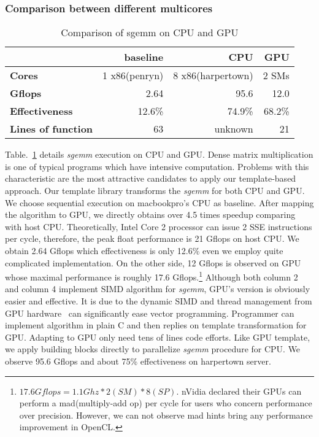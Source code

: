 \subsubsection{Comparison between different multicores}
\begin{table}[hbt]
\caption{Comparison of sgemm on CPU and GPU}\label{tbl:sgemm}
\begin{tabular}{|l|r|r|r|}
\hline
& baseline& CPU & GPU\\
\hline
\textbf{Cores} &1 x86(penryn)& 8 x86(harpertown)& 2 SMs\\
\hline
\textbf{Gflops}& 2.64 &95.6&  12.0\\
\hline
\textbf{Effectiveness}&12.6\%& 74.9\%&68.2\%\\
\hline
\textbf{Lines of function}&63&unknown&21\\
\hline
\end{tabular}
\end{table}

Table.~\ref{tbl:sgemm} details \textit{sgemm} execution on CPU and GPU. Dense matrix
multiplication is one of  typical programs which have
intensive computation. Problems with this characteristic are the most
attractive candidates to apply our template-based approach.
Our template library transforms the \textit{sgemm} for both CPU and 
GPU. We choose sequential execution on macbookpro's CPU as
baseline. After mapping the algorithm to GPU, we directly obtains over
4.5 times speedup comparing with host CPU. Theoretically,  Intel Core
2 processor can issue 2 SSE instructions per cycle,  therefore, the
peak float performance is 21 Gflops on host CPU. We obtain 2.64 Gflops which
effectiveness is only 12.6\% even we employ quite complicated
implementation. On the other side, 12 Gflops is observed on GPU whose
maximal performance is roughly 17.6 Gflops.\footnote{$17.6Gflops = 1.1Ghz * 2(SM) *
  8(SP)$. nVidia declared their GPUs can perform a mad(multiply-add
  op) per cycle  for users who concern performance over precision. However, we can
  not observe mad hints bring any performance improvement in OpenCL. }
Although both column 2 and column 4 implement SIMD algorithm for
\textit{sgemm}, GPU's version is obviously easier and effective. It is
due to the dynamic SIMD and thread management from GPU
hardware~\cite{Fatahalian08} can significantly ease vector programming. Programmer can
implement algorithm in plain C and then replies on template
transformation for GPU.  Adapting to GPU only need tens of lines code
efforts. Like GPU template, we apply building blocks directly to parallelize \textit{sgemm} procedure for CPU. We observe 95.6 
Gflops and about 75\% effectiveness on harpertown server.


